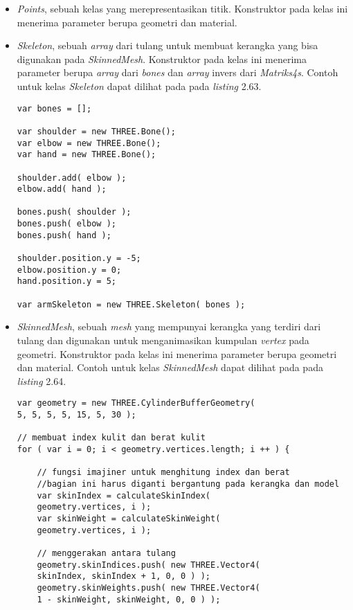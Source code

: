 \begin{itemize}
\begin{itemize}
	\item {\it Points}, sebuah kelas yang merepresentasikan titik. Konstruktor pada kelas ini menerima parameter berupa geometri dan material.
	
	\item {\it Skeleton}, sebuah {\it array} dari tulang untuk membuat kerangka yang bisa digunakan pada {\it SkinnedMesh}. Konstruktor pada kelas ini menerima parameter berupa {\it array} dari {\it bones} dan {\it array} invers dari {\it Matriks4s}. Contoh untuk kelas {\it Skeleton} dapat dilihat pada pada {\it listing} 2.63.
	
\begin{lstlisting}[caption={Contoh penggunaan kelas {\it Skeleton}.},captionpos=b]
var bones = [];

var shoulder = new THREE.Bone();
var elbow = new THREE.Bone();
var hand = new THREE.Bone();

shoulder.add( elbow );
elbow.add( hand );

bones.push( shoulder );
bones.push( elbow );
bones.push( hand );

shoulder.position.y = -5;
elbow.position.y = 0;
hand.position.y = 5;

var armSkeleton = new THREE.Skeleton( bones );
\end{lstlisting}
	
	\item {\it SkinnedMesh}, sebuah {\it mesh} yang mempunyai kerangka yang terdiri dari tulang dan digunakan untuk menganimasikan kumpulan {\it vertex} pada geometri. Konstruktor pada kelas ini menerima parameter berupa geometri dan material. Contoh untuk kelas {\it SkinnedMesh} dapat dilihat pada pada {\it listing} 2.64.
	
\begin{lstlisting}[caption={Contoh penggunaan kelas {\it SkinnedMesh}.},captionpos=b]
var geometry = new THREE.CylinderBufferGeometry( 
5, 5, 5, 5, 15, 5, 30 );

// membuat index kulit dan berat kulit
for ( var i = 0; i < geometry.vertices.length; i ++ ) {

	// fungsi imajiner untuk menghitung index dan berat
	//bagian ini harus diganti bergantung pada kerangka dan model
	var skinIndex = calculateSkinIndex( 
	geometry.vertices, i );
	var skinWeight = calculateSkinWeight( 
	geometry.vertices, i );

	// menggerakan antara tulang
	geometry.skinIndices.push( new THREE.Vector4( 
	skinIndex, skinIndex + 1, 0, 0 ) );
	geometry.skinWeights.push( new THREE.Vector4(
	1 - skinWeight, skinWeight, 0, 0 ) );


\end{lstlisting}
\end{itemize}
\end{itemize}
